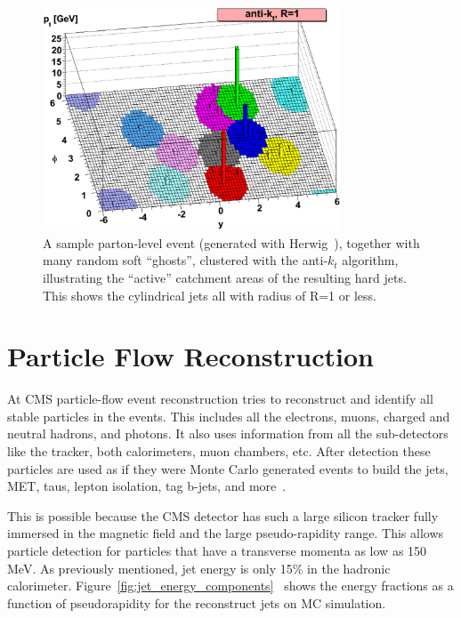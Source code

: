 \begin{figure}

\includegraphics[width=0.79\textwidth]{Reconstruction/herwig-parton-level-ev-antikt-R1-ghosted4root.eps}
\centering
\caption{A sample parton-level event (generated with
    Herwig~\cite{Herwig}), together with many random soft ``ghosts'',
    clustered with the anti-$k_t$ algorithm, illustrating the
    ``active'' catchment areas of the resulting hard jets. This shows the cylindrical jets all with radius of R=1 or less.~\cite{1126-6708-2008-04-063}}
\label{fig:anti_atk}
\end{figure}

\section{Particle Flow Reconstruction}

At CMS particle-flow event reconstruction tries to reconstruct and identify all stable particles in the events.  This includes all the electrons, muons, charged and neutral hadrons, and photons.  It also uses information from all the sub-detectors like the tracker, both calorimeters, muon chambers, etc. After detection these particles are used as if they were Monte Carlo generated events to build the jets, MET, taus, lepton isolation, tag b-jets, and more~\cite{particleflow}.

This is possible because the CMS detector has such a large silicon tracker fully immersed in the magnetic field and the large pseudo-rapidity range. This allows particle detection for particles that have a transverse momenta as low as 150 MeV.  As previously mentioned, jet energy is only 15\% in the hadronic calorimeter. Figure~\ref{fig:jet_energy_components}~\cite{Pandolfi_thesis} shows the energy fractions as a function of pseudorapidity for the reconstruct jets on MC simulation.  


